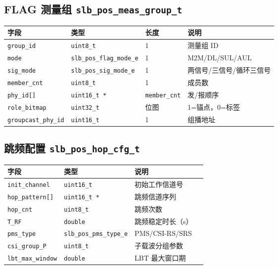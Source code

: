 \documentclass[11pt,a4paper]{ctexart}
\begin{document}
\subsection{FLAG 测量组 \texttt{slb\_pos\_meas\_group\_t}}

\begin{table}[h]
\centering
\small
\begin{tabular}{llll}
\toprule
\textbf{字段} & \textbf{类型} & \textbf{长度} & \textbf{说明} \\
\midrule
\texttt{group\_id} & \texttt{uint8\_t} & 1 & 测量组 ID \\
\texttt{mode} & \texttt{slb\_pos\_flag\_mode\_e} & 1 & M2M/DL/SUL/AUL \\
\texttt{sig\_mode} & \texttt{slb\_pos\_sig\_mode\_e} & 1 & 两信号/三信号/循环三信号 \\
\texttt{member\_cnt} & \texttt{uint8\_t} & 1 & 成员数 \\
\texttt{phy\_id[]} & \texttt{uint16\_t *} & \texttt{member\_cnt} & 发/报顺序 \\
\texttt{role\_bitmap} & \texttt{uint32\_t} & 位图 & 1=锚点，0=标签 \\
\texttt{groupcast\_phy\_id} & \texttt{uint16\_t} & 1 & 组播地址 \\
\bottomrule
\end{tabular}
\end{table}

\subsection{跳频配置 \texttt{slb\_pos\_hop\_cfg\_t}}

\begin{table}[h]
\centering
\small
\begin{tabular}{llll}
\toprule
\textbf{字段} & \textbf{类型} & \textbf{说明} \\
\midrule
\texttt{init\_channel} & \texttt{uint16\_t} & 初始工作信道号 \\
\texttt{hop\_pattern[]} & \texttt{uint16\_t *} & 跳频信道序列 \\
\texttt{hop\_cnt} & \texttt{uint8\_t} & 跳频次数 \\
\texttt{T\_RF} & \texttt{double} & 跳频稳定时长（s） \\
\texttt{pms\_type} & \texttt{slb\_pos\_pms\_type\_e} & PMS/CSI-RS/SRS \\
\texttt{csi\_group\_P} & \texttt{uint8\_t} & 子载波分组参数 \\
\texttt{lbt\_max\_window} & \texttt{double} & LBT 最大窗口期 \\
\bottomrule
\end{tabular}
\end{table}
\end{document}
